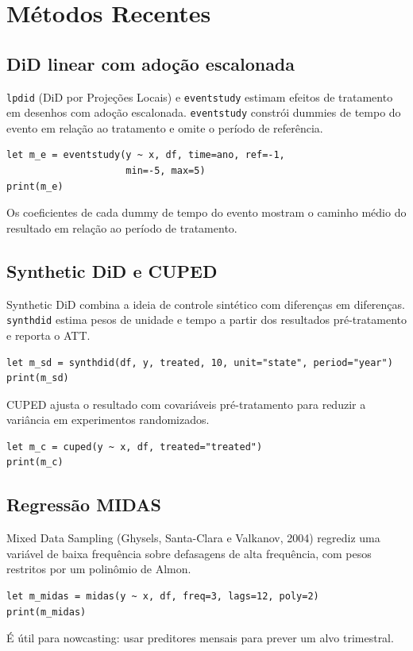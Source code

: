 \chapter{Métodos Recentes}

\section{DiD linear com adoção escalonada}

\texttt{lpdid} (DiD por Projeções Locais) e \texttt{eventstudy} estimam efeitos de
tratamento em desenhos com adoção escalonada. \texttt{eventstudy} constrói
dummies de tempo do evento em relação ao tratamento e omite o período de
referência.

\begin{lstlisting}[caption={Event study}]
let m_e = eventstudy(y ~ x, df, time=ano, ref=-1,
                     min=-5, max=5)
print(m_e)
\end{lstlisting}

Os coeficientes de cada dummy de tempo do evento mostram o caminho
médio do resultado em relação ao período de tratamento.

\section{Synthetic DiD e CUPED}

Synthetic DiD combina a ideia de controle sintético com diferenças em
diferenças. \texttt{synthdid} estima pesos de unidade e tempo a partir dos
resultados pré-tratamento e reporta o ATT.

\begin{lstlisting}[caption={Synthetic DiD}]
let m_sd = synthdid(df, y, treated, 10, unit="state", period="year")
print(m_sd)
\end{lstlisting}

CUPED ajusta o resultado com covariáveis pré-tratamento para reduzir a
variância em experimentos randomizados.

\begin{lstlisting}[caption={CUPED}]
let m_c = cuped(y ~ x, df, treated="treated")
print(m_c)
\end{lstlisting}

\section{Regressão MIDAS}

Mixed Data Sampling (Ghysels, Santa-Clara e Valkanov, 2004) regrediz uma
variável de baixa frequência sobre defasagens de alta frequência, com
pesos restritos por um polinômio de Almon.

\begin{lstlisting}[caption={MIDAS}]
let m_midas = midas(y ~ x, df, freq=3, lags=12, poly=2)
print(m_midas)
\end{lstlisting}

É útil para nowcasting: usar preditores mensais para prever um alvo
trimestral.
